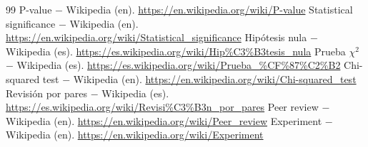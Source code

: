 \documentclass{book}
\begin{document}
\begin{thebibliography}{99}
 P-value \(-\) Wikipedia (en). \url{https://en.wikipedia.org/wiki/P-value}
 Statistical significance \(-\) Wikipedia (en). \url{https://en.wikipedia.org/wiki/Statistical_significance}
 Hipótesis nula \(-\) Wikipedia (es). \url{https://es.wikipedia.org/wiki/Hip%C3%B3tesis_nula}
 Prueba \(\chi^{2}\) \(-\) Wikipedia (es). \url{https://es.wikipedia.org/wiki/Prueba_%CF%87%C2%B2}
 Chi-squared test \(-\) Wikipedia (en). \url{https://en.wikipedia.org/wiki/Chi-squared_test}
 Revisión por pares \(-\) Wikipedia (es). \url{https://es.wikipedia.org/wiki/Revisi%C3%B3n_por_pares}
 Peer review \(-\) Wikipedia (en). \url{https://en.wikipedia.org/wiki/Peer_review}
 Experiment \(-\) Wikipedia (en). \url{https://en.wikipedia.org/wiki/Experiment}
\end{thebibliography}
\end{document}
